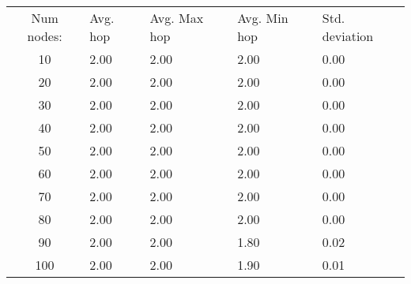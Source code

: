 \begin{tabular}{cllll}
Num nodes: & Avg. hop & Avg. Max hop & Avg. Min hop & Std. deviation \\
10       & 2.00        & 2.00            & 2.00 & 0.00 \\
20       & 2.00        & 2.00            & 2.00 & 0.00 \\
30       & 2.00        & 2.00            & 2.00 & 0.00 \\
40       & 2.00        & 2.00            & 2.00 & 0.00 \\
50       & 2.00        & 2.00            & 2.00 & 0.00 \\
60       & 2.00        & 2.00            & 2.00 & 0.00 \\
70       & 2.00        & 2.00            & 2.00 & 0.00 \\
80       & 2.00        & 2.00            & 2.00 & 0.00 \\
90       & 2.00        & 2.00            & 1.80 & 0.02 \\
100       & 2.00        & 2.00            & 1.90 & 0.01 \\
\end{tabular}